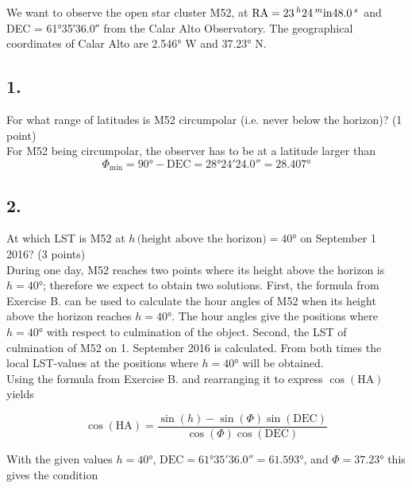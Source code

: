 \documentclass[11pt,a4paper,twoside]{article}
\begin{document}
We want to observe the open star cluster M52, at $\text{RA} = \SI{23}{^\hour} \SI{24}{^\minute} \SI{48.0}{^\second}$ and DEC = \ang{61;35;36.0} from the Calar Alto Observatory. The geographical coordinates of Calar Alto are \ang{2.546} W and \ang{37.23} N.

\subsection*{1.} For what range of latitudes is M52 circumpolar (i.e. never below the horizon)? (1 point) \\

For M52 being circumpolar, the observer has to be at a latitude larger than 
\begin{equation}
 \Phi_{\text{min}} = \ang{90} - \text{DEC} = \ang{28;24;24.0} = \ang{28.407}
\end{equation}

\subsection*{2.} At which LST is M52 at $h \, \text{(height above the horizon)} = \ang{40}$ on September 1 2016? (3 points) \\

During one day, M52 reaches two points where its height above the horizon is $h=\ang{40}$; therefore we expect to obtain two solutions. First, the formula from Exercise B. can be used to calculate the hour angles of M52 when its height above the horizon reaches $h=\ang{40}$. The hour angles give the positions where $h=\ang{40}$ with respect to culmination of the object. Second, the LST of culmination of M52 on 1. September 2016 is calculated. From both times the local LST-values at the positions where $h=\ang{40}$ will be obtained. \\

Using the formula from Exercise B. and rearranging it to express $\cos{ \left( \text{HA} \right)}$ yields

\begin{equation}
 \cos{ \left( \text{HA} \right)} = \frac{\sin{\left( h \right)} - \sin{\left( \Phi \right)} \sin{\left( \text{DEC} \right)}}{\cos{ \left( \Phi \right)} \cos{ \left( \text{DEC} \right)}}
\end{equation}

With the given values $h = \ang{40}$, $\text{DEC} = \ang{61;35;36.0} = \ang{61.593}$, and $\Phi = \ang{37.23}$ this gives the condition
\end{document}

